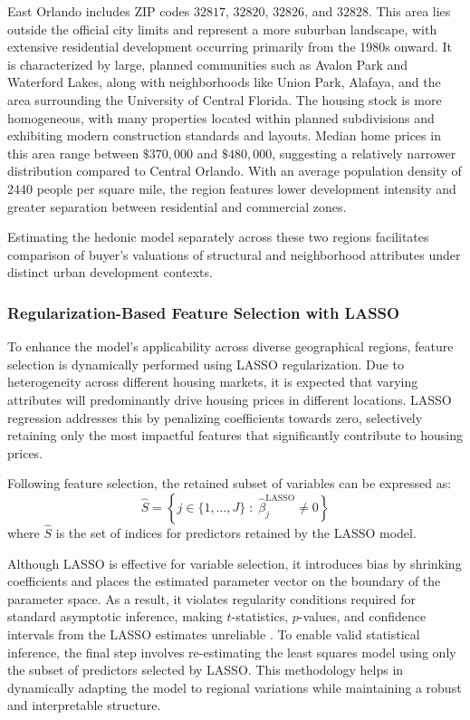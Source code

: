 East Orlando includes ZIP codes $32817$, $32820$, $32826$, and $32828$. This area lies outside the official city limits and represent a more suburban landscape, with extensive residential development occurring primarily from the 1980s onward. It is characterized by large, planned communities such as Avalon Park and Waterford Lakes, along with neighborhoods like Union Park, Alafaya, and the area surrounding the University of Central Florida. The housing stock is more homogeneous, with many properties located within planned subdivisions and exhibiting modern construction standards and layouts. Median home prices in this area range between $\$370,000$ and $\$480,000$, suggesting a relatively narrower distribution compared to Central Orlando. With an average population density of 2440 people per square mile, the region features lower development intensity and greater separation between residential and commercial zones.

Estimating the hedonic model separately across these two regions facilitates comparison of buyer's valuations of structural and neighborhood attributes under distinct urban development contexts.

\subsubsection*{Regularization-Based Feature Selection with LASSO}

To enhance the model's applicability across diverse geographical regions, feature selection is dynamically performed using LASSO regularization. Due to heterogeneity across different housing markets, it is expected that varying attributes will predominantly drive housing prices in different locations. LASSO regression addresses this by penalizing coefficients towards zero, selectively retaining only the most impactful features that significantly contribute to housing prices. 


Following feature selection, the retained subset of variables can be expressed as:
\[
\widehat{S} = \left\{ j \in \{1, \dots, J\} \; : \; \hat{\beta}^{\text{LASSO}}_j \neq 0 \right\}
\]
\noindent where $\widehat{S}$ is the set of indices for predictors retained by the LASSO model. 




Although LASSO is effective for variable selection, it introduces bias by shrinking coefficients and places the estimated parameter vector on the boundary of the parameter space. As a result, it violates regularity conditions required for standard asymptotic inference, making $t$-statistics, $p$-values, and confidence intervals from the LASSO estimates unreliable \citep{lockhartEtAl:2014}. To enable valid statistical inference, the final step involves re-estimating the least squares model using only the subset of predictors selected by LASSO. This methodology helps in dynamically adapting the model to regional variations while maintaining a robust and interpretable structure.




